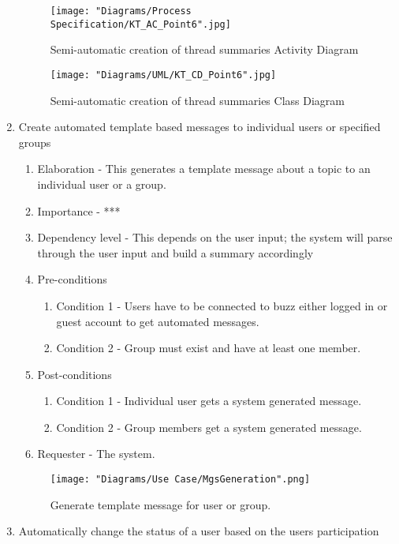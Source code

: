 \documentclass[12pt]{article}
\begin{document}
\begin{enumerate}
\begin{figure}[h]
	\centering
	\texttt{[image: "Diagrams/Process Specification/KT\_AC\_Point6".jpg]}
	\caption{Semi-automatic creation of thread summaries Activity Diagram}
\end{figure}
\begin{figure}[h]
	\centering
	\texttt{[image: "Diagrams/UML/KT\_CD\_Point6".jpg]}
	\caption{Semi-automatic creation of thread summaries Class Diagram}
\end{figure}
\newpage %
   \item Create automated template based messages to individual users or specified groups   %
  \begin{enumerate}
    \item Elaboration - This generates a template message about a topic to an individual user or a group.
    \item Importance - ***
    \item Dependency level - This depends on the user input; the system will parse through the user input and build a summary accordingly
    \item Pre-conditions
    \begin{enumerate}
 		\item Condition 1 - Users have to be connected to buzz either logged in or guest account to get automated messages.
    	\item Condition 2 - Group must exist and have at least one member.
    \end{enumerate}
        \item Post-conditions
    \begin{enumerate}
    	\item Condition 1 - Individual user gets a system generated message.
    	\item Condition 2 - Group members get a system generated message.
    \end{enumerate}
    \item Requester - The system.
  \end{enumerate}
	\begin{figure}[h]
    	\centering
    	\texttt{[image: "Diagrams/Use Case/MgsGeneration".png]}
    	\caption{Generate template message for user or group.}
    \end{figure}
\newpage %
   \item Automatically change the status of a user based on the users participation %
  \begin{enumerate}

\end{enumerate}
\end{enumerate}
\end{document}
